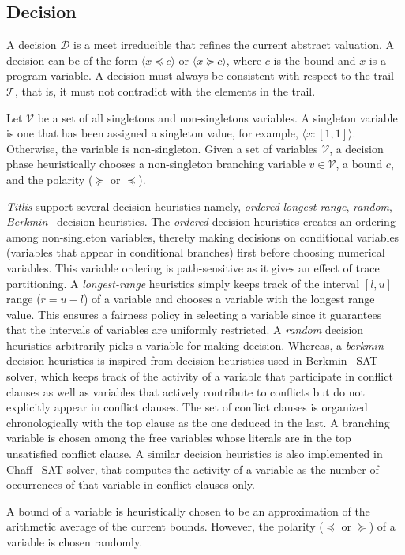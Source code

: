 \subsection{Decision}
A decision $\mathcal{D}$ is a meet irreducible that refines the 
current abstract valuation.  A decision can be of the form 
$\langle x \preceq c \rangle$ or $\langle x \succeq c \rangle$, 
where $c$ is the bound and $x$ is a program variable.  A 
decision must always be consistent with respect to the 
trail $\mathcal{T}$, that is, it must not contradict with 
the elements in the trail.  

Let $\mathcal{V}$ be a set of all singletons and non-singletons 
variables.  A singleton variable is one that has been assigned a 
singleton value, for example, $\langle x:[1,1] \rangle$.  Otherwise, 
the variable is non-singleton.  Given a set of variables $\mathcal{V}$, 
a decision phase heuristically chooses a non-singleton branching 
variable $v \in \mathcal{V}$, a bound $c$, and the polarity ($\succeq$ or 
$\preceq$).  

{\em Titlis} support several decision heuristics namely, {\em ordered} 
{\em longest-range}, {\em random}, {\em Berkmin}~\cite{} decision heuristics.  
The {\em ordered} decision heuristics creates an ordering among non-singleton 
variables, thereby making decisions on conditional variables (variables that 
appear in conditional branches) first before choosing numerical variables.  
This variable ordering is path-sensitive as it gives an effect of trace
partitioning.  A {\em longest-range} heuristics simply keeps track of the
interval $[l,u]$ range ($r=u-l$) of a variable and chooses a variable with 
the longest range value.  This ensures a fairness policy in selecting a 
variable since it guarantees that the intervals of variables are uniformly 
restricted.  A {\em random} decision heuristics arbitrarily picks a variable 
for making decision.  Whereas, a {\em berkmin} decision heuristics is inspired 
from decision heuristics used in Berkmin~\cite{eugoldberg07} SAT solver, which 
keeps track of the activity of a variable that participate in conflict clauses 
as well as variables that actively contribute to conflicts but do not explicitly 
appear in conflict clauses.  The set of conflict clauses is organized 
chronologically with the top clause as the one deduced in the last.  A 
branching variable is chosen among the free variables whose literals are 
in the top unsatisfied conflict clause.  A similar decision heuristics is 
also implemented in Chaff~\cite{chaff} SAT solver, that computes the activity 
of a variable as the number of occurrences of that variable in conflict 
clauses only.  

A bound of a variable is heuristically chosen to be an approximation of the 
arithmetic average of the current bounds.  However, the polarity ($\preceq$ or
$\succeq$) of a variable is chosen randomly.  
